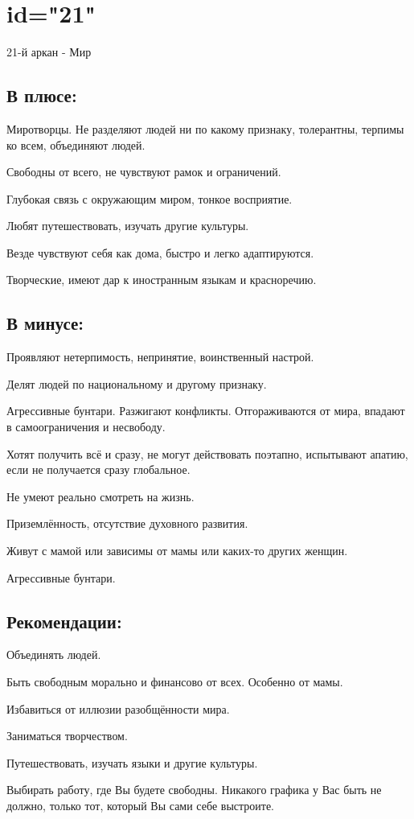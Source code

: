 \endsection

\section{id="21"}{21-й аркан - Мир}

\subsection{В плюсе:}
\item Миротворцы. Не разделяют людей ни по какому признаку, толерантны, терпимы ко всем, объединяют людей.
\item Свободны от всего, не чувствуют рамок и ограничений.
\item Глубокая связь с окружающим миром, тонкое восприятие.
\item Любят путешествовать, изучать другие культуры.
\item Везде чувствуют себя как дома, быстро и легко адаптируются.
\item Творческие, имеют дар к иностранным языкам и красноречию.
\endsubsection

\subsection{В минусе:}
\item Проявляют нетерпимость, непринятие, воинственный настрой.
\item Делят людей по национальному и другому признаку.
\item Агрессивные бунтари. Разжигают конфликты. Отгораживаются от мира, впадают в самоограничения и несвободу.
\item Хотят получить всё и сразу, не могут действовать поэтапно, испытывают апатию, если не получается сразу глобальное.
\item Не умеют реально смотреть на жизнь.
\item Приземлённость, отсутствие духовного развития.
\item Живут с мамой или зависимы от мамы или каких-то других женщин.
\item Агрессивные бунтари.
\endsubsection

\subsection{Рекомендации:}
\item Объединять людей.
\item Быть свободным морально и финансово от всех. Особенно от мамы.
\item Избавиться от иллюзии разобщённости мира.
\item Заниматься творчеством.
\item Путешествовать, изучать языки и другие культуры.
\item Выбирать работу, где Вы будете свободны. Никакого графика у Вас быть не должно, только тот, который Вы сами себе выстроите.
\endsubsection

